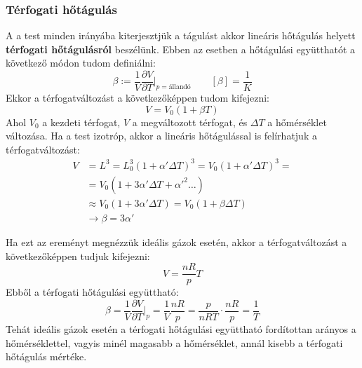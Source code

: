 \documentclass[../main.tex]{subfiles}
\begin{document}
\subsubsection*{Térfogati hőtágulás}
A a test minden irányába kiterjesztjük a tágulást akkor lineáris hőtágulás helyett \textbf{térfogati hőtágulásról} beszélünk. Ebben az esetben a hőtágulási együtthatót a következő módon tudom definiálni:
\begin{equation}
    \beta := \frac{1}{V} \frac{\partial V}{\partial T}\bigg|_{p=\text{állandó}} \quad \quad \left[\beta\right] = \frac{1}{K}
\end{equation}
Ekkor a térfogatváltozást a következőképpen tudom kifejezni:
\begin{equation}
    V = V_0 (1 + \beta T)
\end{equation}
Ahol $V_0$ a kezdeti térfogat, $V$ a megváltozott térfogat, és $\Delta T$ a hőmérséklet változása. Ha a test izotróp, akkor a lineáris hőtágulással is felírhatjuk a térfogatváltozást:
\begin{equation}
    \begin{aligned}
        V &= L^3 = L_0^3 (1 + \alpha' \Delta T)^3 = V_0 (1 + \alpha' \Delta T)^3 = \\
        &= V_0 (1 + 3\alpha' \Delta T + \alpha'^2 \dots)  \\
        &\approx V_0 (1 + 3\alpha' \Delta T) = V_0 (1 + \beta \Delta T) \\
        &\rightarrow \beta = 3 \alpha'
    \end{aligned}
\end{equation}

Ha ezt az ereményt megnézzük ideális gázok esetén, akkor a térfogatváltozást a következőképpen tudjuk kifejezni:
\begin{equation}
    V = \frac{nR}{p} T
\end{equation}
Ebből a térfogati hőtágulási együttható:
\begin{equation}
    \beta = \frac{1}{V} \frac{\partial V}{\partial T}\bigg|_{p} = \frac{1}{V} \frac{nR}{p} = \frac{p}{nRT} \cdot \frac{nR}{p} = \frac{1}{T}
\end{equation}
Tehát ideális gázok esetén a térfogati hőtágulási együttható fordítottan arányos a hőmérséklettel, vagyis minél magasabb a hőmérséklet, annál kisebb a térfogati hőtágulás mértéke.
\end{document}
